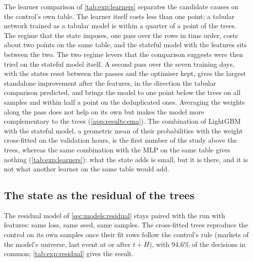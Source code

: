 The learner comparison of \cref{tab:exp:learners} separates the candidate causes on the
control's own table.  The learner itself costs less than one point: a tabular network
trained as a tabular model is within a quarter of a point of the trees.  The regime that the
state imposes, one pass over the rows in time order, costs about two points on the same
table, and the stateful model with the features sits between the two.  The two regime levers
that the comparison suggests were then tried on the stateful model itself.  A second pass
over the seven training days, with the states reset between the passes and the optimiser
kept, gives the largest standalone improvement after the features, in the direction the
tabular comparison predicted, and brings the model to one point below the trees on all
samples and within half a point on the deduplicated ones.  Averaging the weights along the
pass does not help on its own but makes the model more complementary to the trees
(\cref{app:results:ema}).  The combination of LightGBM with the stateful model, a geometric
mean of their probabilities with the weight cross-fitted on the validation hours, is the
first number of the study above the trees, whereas the same combination with the MLP on
the same table gives nothing (\cref{tab:exp:learners}): what the state adds is small, but it is
there, and it is not what another learner on the same table would add.

\subsection{The state as the residual of the trees}
\label{sec:stateful:residual}
\label{sec:stateful:calibration}

The residual model of \cref{sec:models:residual} stays paired with the run with features:
same loss, same seed, same samples.  The cross-fitted trees reproduce the control on its own
samples once their fit rows follow the control's rule (markets of the model's universe, last
event at or after $t + H$), with 94.6\% of the decisions in common; \cref{tab:exp:residual}
gives the result.

